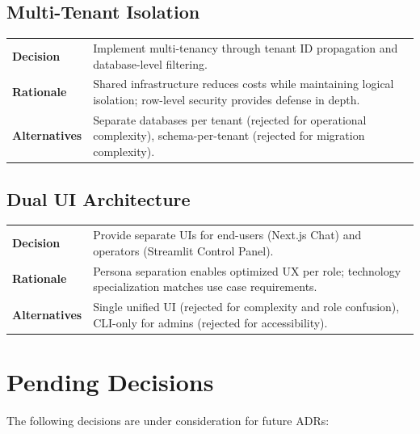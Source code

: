 \documentclass[a4paper,twoside]{sapthesis}
\begin{document}
\subsection{Multi-Tenant Isolation}

\begin{table}[ht]
\centering
\small
\begin{tabularx}{\textwidth}{lX}
    \hline
    \textbf{Decision} & Implement multi-tenancy through tenant ID propagation and database-level filtering. \\
    \textbf{Rationale} & Shared infrastructure reduces costs while maintaining logical isolation; row-level security provides defense in depth. \\
    \textbf{Alternatives} & Separate databases per tenant (rejected for operational complexity), schema-per-tenant (rejected for migration complexity). \\
    \hline
\end{tabularx}
\end{table}

\subsection{Dual UI Architecture}

\begin{table}[ht]
\centering
\small
\begin{tabularx}{\textwidth}{lX}
    \hline
    \textbf{Decision} & Provide separate UIs for end-users (Next.js Chat) and operators (Streamlit Control Panel). \\
    \textbf{Rationale} & Persona separation enables optimized UX per role; technology specialization matches use case requirements. \\
    \textbf{Alternatives} & Single unified UI (rejected for complexity and role confusion), CLI-only for admins (rejected for accessibility). \\
    \hline
\end{tabularx}
\end{table}

\section{Pending Decisions}
\label{app:adr:pending}

The following decisions are under consideration for future ADRs:
\end{document}
